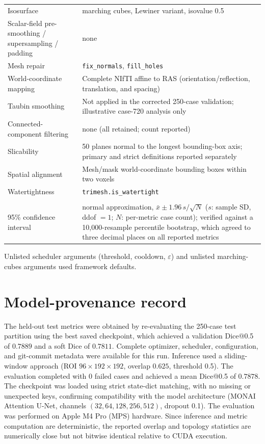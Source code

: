 \documentclass[anonymous]{iopjournal}
\begin{document}
\begin{table}[H]
\begin{threeparttable}
\begin{tabularx}{0.92\textwidth}{L{0.46\textwidth}Y}
Isosurface & marching cubes, Lewiner variant, isovalue 0.5 \\
Scalar-field pre-smoothing / supersampling / padding & none \\
Mesh repair & \texttt{fix\_normals}, \texttt{fill\_holes} \\
World-coordinate mapping & Complete NIfTI affine to RAS (orientation/reflection, translation, and spacing) \\
Taubin smoothing & Not applied in the corrected 250-case validation; illustrative case-720 analysis only \\
Connected-component filtering & none (all retained; count reported) \\
Slicability & 50 planes normal to the longest bounding-box axis; primary and strict definitions reported separately \\
Spatial alignment & Mesh/mask world-coordinate bounding boxes within two voxels \\
Watertightness & \texttt{trimesh.is\_watertight} \\
\addlinespace
{}\\
95\% confidence interval & normal approximation, $\bar{x}\pm 1.96\,s/\sqrt{N}$ ($s$: sample SD, ddof $=1$; $N$: per-metric case count); verified against a 10{,}000-resample percentile bootstrap, which agreed to three decimal places on all reported metrics \\
\bottomrule
\end{tabularx}
\begin{tablenotes}\footnotesize
\item Unlisted scheduler arguments (threshold, cooldown, $\varepsilon$) and unlisted marching-cubes arguments used framework defaults.
\end{tablenotes}
\end{threeparttable}
\end{table}

\section{Model-provenance record}
\label{app:provenance}

The held-out test metrics were obtained by re-evaluating the 250-case test partition using the best saved checkpoint, which achieved a validation Dice@0.5 of $0.7889$ and a soft Dice of $0.7811$. Complete optimizer, scheduler, configuration, and git-commit metadata were available for this run. Inference used a sliding-window approach (ROI $96\times192\times192$, overlap $0.625$, threshold 0.5). The evaluation completed with 0 failed cases and achieved a mean Dice@0.5 of $0.7878$. The checkpoint was loaded using strict state-dict matching, with no missing or unexpected keys, confirming compatibility with the model architecture (MONAI Attention U-Net, channels $(32,64,128,256,512)$, dropout 0.1). The evaluation was performed on Apple M4 Pro (MPS) hardware. Since inference and metric computation are deterministic, the reported overlap and topology statistics are numerically close but not bitwise identical relative to CUDA execution.
\end{document}
